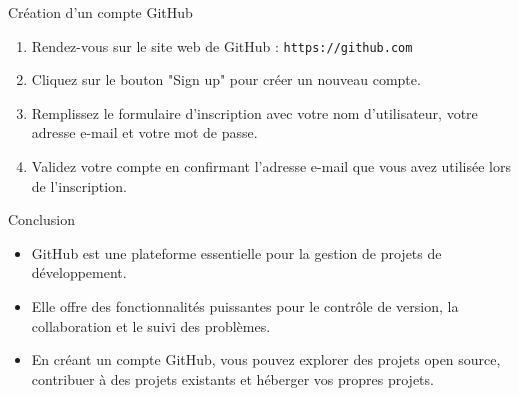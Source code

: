 \documentclass{beamer}
\begin{document}
\begin{frame}{Création d'un compte GitHub}
	\begin{enumerate}
		\item Rendez-vous sur le site web de GitHub : \texttt{https://github.com}
		\item Cliquez sur le bouton "Sign up" pour créer un nouveau compte.
		\item Remplissez le formulaire d'inscription avec votre nom d'utilisateur, votre adresse e-mail et votre mot de passe.
		\item Validez votre compte en confirmant l'adresse e-mail que vous avez utilisée lors de l'inscription.
	\end{enumerate}
\end{frame}

\begin{frame}{Conclusion}
	\begin{itemize}
		\item GitHub est une plateforme essentielle pour la gestion de projets de développement.
		\item Elle offre des fonctionnalités puissantes pour le contrôle de version, la collaboration et le suivi des problèmes.
		\item En créant un compte GitHub, vous pouvez explorer des projets open source, contribuer à des projets existants et héberger vos propres projets.
	\end{itemize}
\end{frame}
\end{document}

